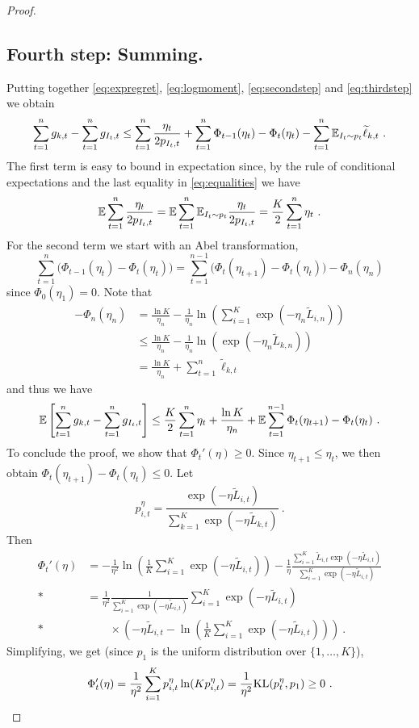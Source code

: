 \begin{proof}
\subsection*{Fourth step: Summing.}
%
Putting together \eqref{eq:expregret}, \eqref{eq:logmoment}, \eqref{eq:secondstep} and \eqref{eq:thirdstep} we obtain
$$\sum_{t=1}^n g_{k,t} - \sum_{t=1}^n g_{I_t,t} \leq \sum_{t=1}^n \frac{\eta_t}{2 p_{I_t,t}} + \sum_{t=1}^n \Phi_{t-1}(\eta_t) - \Phi_t(\eta_t) - \sum_{t=1}^n \mathbb{E}_{I_t \sim p_t} \widetilde{\ell}_{k,t}~.$$
The first term is easy to bound in expectation since, by the rule of conditional expectations and the last equality in \eqref{eq:equalities} we have
$$\mathbb{E} \sum_{t=1}^n \frac{\eta_t}{2 p_{I_t,t}} = \mathbb{E} \sum_{t=1}^n \mathbb{E}_{I_t \sim p_t} \frac{\eta_t}{2 p_{I_t,t}} = \frac{K}{2} \sum_{t=1}^n \eta_t~.$$
For the second term we start with an Abel transformation,
$$\sum_{t=1}^n \bigl(\Phi_{t-1}(\eta_t) - \Phi_t(\eta_t)\bigr) = \sum_{t=1}^{n-1} \bigl(\Phi_t(\eta_{t+1}) - \Phi_t(\eta_t)\bigr) - \Phi_n(\eta_n)$$
since $\Phi_0(\eta_1)=0$. Note that
\begin{align*}
- \Phi_n(\eta_n) & = \frac{\ln K}{\eta_n} - \frac{1}{\eta_n} \ln\left(\sum_{i=1}^K \exp\left(-\eta_n \tilde{L}_{i,n}\right)\right) \\ & \leq \frac{\ln K}{\eta_n} - \frac{1}{\eta_n} \ln\left(\exp\left(-\eta_n \tilde{L}_{k,n}\right)\right)\\
& =  \frac{\ln K}{\eta_n} + \sum_{t=1}^n \tilde{\ell}_{k,t}
\end{align*}
and thus we have
$$\mathbb{E} \left[ \sum_{t=1}^n g_{k,t} - \sum_{t=1}^n g_{I_t,t} \right] \leq \frac{K}{2} \sum_{t=1}^n \eta_t + \frac{\ln K}{\eta_n} + \mathbb{E} \sum_{t=1}^{n-1} \Phi_t(\eta_{t+1}) - \Phi_t(\eta_t)~.$$
To conclude the proof, we show that $\Phi_t'(\eta)\geq 0$. Since $\eta_{t+1}\leq \eta_t$, we then obtain $\Phi_t(\eta_{t+1}) - \Phi_t(\eta_t) \leq 0$. 
Let
\[
    p_{i,t}^{\eta}=\frac{\exp{\left(- \eta \tilde{L}_{i,t}\right)}}{\sum_{k=1}^K \exp{\left(- \eta \tilde{L}_{k,t}\right)}}~.
\]
Then
\begin{align*}
\Phi_t'(\eta) & = - \frac{1}{\eta^2} \ln\left(\frac{1}{K} \sum_{i=1}^K \exp{\left(- \eta \tilde{L}_{i,t}\right)}\right) - \frac{1}{\eta}\frac{\sum_{i=1}^K \tilde{L}_{i,t} \exp{\left(- \eta \tilde{L}_{i,t}\right)}}{\sum_{i=1}^K \exp{\left(- \eta \tilde{L}_{i,t}\right)}} \\*
& = \frac{1}{\eta^2} \frac{1}{\sum_{i=1}^K \exp{\left(- \eta \tilde{L}_{i,t}\right)}} \sum_{i=1}^K \exp{\left(- \eta \tilde{L}_{i,t}\right)} \\*
& \qquad \times \left(-\eta \tilde{L}_{i,t} - \ln\left(\frac{1}{K} \sum_{i=1}^K \exp{\left(- \eta \tilde{L}_{i,t}\right)}\right) \right)~.
\end{align*}
Simplifying, we get (since $p_1$ is the uniform distribution over $\{1,\hdots,K\}$),
\[
\Phi_t'(\eta) = \frac{1}{\eta^2} \sum_{i=1}^K p_{i,t}^{\eta} \ln(K p_{i,t}^{\eta}) = \frac{1}{\eta^2} \mathrm{KL}(p_t^{\eta}, p_1) \geq 0~.
\]
\end{proof}

